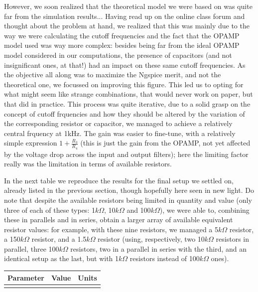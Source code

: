However, we soon realized that the theoretical model we were based on was quite far from the simulation results... Having read up on the online class forum and thought about the problem at hand, we realized that this was mainly due to the way we were calculating the cutoff frequencies and the fact that the OPAMP model used was way more complex: besides being far from the ideal OPAMP model considered in our computations, the presence of capacitors (and not insignificant ones, at that!) had an impact on these same cutoff frequencies. As the objective all along was to maximize the Ngspice merit, and not the theoretical one, we focussed on improving this figure. This led us to opting for what might seem like strange combinations, that would never work on paper, but that did in practice. This process was quite iterative, due to a solid grasp on the concept of cutoff frquencies and how they should be altered by the variation of the corresponding resistor or capacitor, we managed to achieve a relatively central frquency at 1kHz. The gain was easier to fine-tune, with a relatively simple expression $1+\frac{R_3}{R_4}$ (this is just the gain from the OPAMP, not yet affected by the voltage drop across the input and output filters); here the limiting factor really was the limitation in terms of available resistors.

In the next table we reproduce the results for the final setup we settled on, already listed in the previous section, though hopefully here seen in new light. Do note that despite the available resistors being limited in quantity and value (only three of each of these types: 1$k\Omega$, 10$k\Omega$ and 100$k\Omega$), we were able to, combining these in parallels and in series, obtain a larger array of available equivalent resistor values: for example, with these nine resistors, we managed a 5$k\Omega$ resistor, a 150$k\Omega$ resistor, and a 1.5$k\Omega$ resistor (using, respectively, two 10$k\Omega$ resistors in parallel, three 100$k\Omega$ resistors, two in a parallel in series with the third, and an identical setup as the last, but with 1$k\Omega$ resistors instead of 100$k\Omega$ ones).


\hfill
 \parbox{1\linewidth}{
  \centering
  \begin{tabular}{|l|l|r|}
    \hline    
    {\bf Parameter} & {\bf Value} & {\bf Units }\\ \hline
    
  \label{tab:params2}
  \end{tabular}
  }
\par

